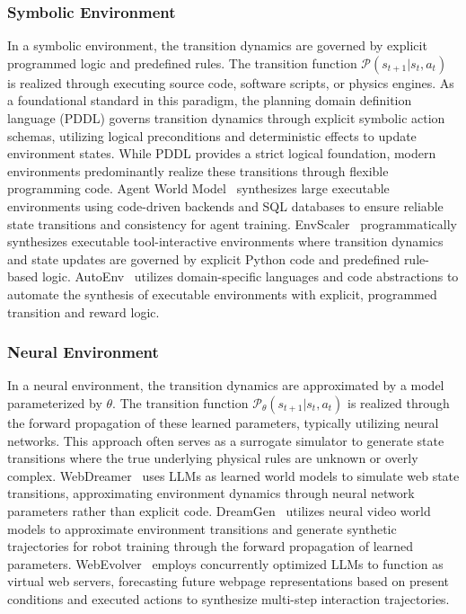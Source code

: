 \subsubsection{Symbolic Environment}
In a symbolic environment, the transition dynamics are governed by explicit programmed logic and predefined rules. The transition function $\mathcal{P}(s_{t+1} | s_t, a_t)$ is realized through executing source code, software scripts, or physics engines. As a foundational standard in this paradigm, the planning domain definition language (PDDL) governs transition dynamics through explicit symbolic action schemas, utilizing logical preconditions and deterministic effects to update environment states. While PDDL provides a strict logical foundation, modern environments predominantly realize these transitions through flexible programming code. Agent World Model~\cite{Agent_world_model} synthesizes large executable environments using code-driven backends and SQL databases to ensure reliable state transitions and consistency for agent training. EnvScaler~\cite{EnvScaler} programmatically synthesizes executable tool-interactive environments where transition dynamics and state updates are governed by explicit Python code and predefined rule-based logic. AutoEnv~\cite{AutoEnv} utilizes domain-specific languages and code abstractions to automate the synthesis of executable environments with explicit, programmed transition and reward logic.

\subsubsection{Neural Environment}
In a neural environment, the transition dynamics are approximated by a model parameterized by $\theta$. The transition function $\mathcal{P}_{\theta}(s_{t+1} | s_t, a_t)$ is realized through the forward propagation of these learned parameters, typically utilizing neural networks. This approach often serves as a surrogate simulator to generate state transitions where the true underlying physical rules are unknown or overly complex. WebDreamer~\cite{WebDreamer} uses LLMs as learned world models to simulate web state transitions, approximating environment dynamics through neural network parameters rather than explicit code. DreamGen~\cite{DreamGen} utilizes neural video world models to approximate environment transitions and generate synthetic trajectories for robot training through the forward propagation of learned parameters. WebEvolver~\cite{WebEvolver} employs concurrently optimized LLMs to function as virtual web servers, forecasting future webpage representations based on present conditions and executed actions to synthesize multi-step interaction trajectories.



